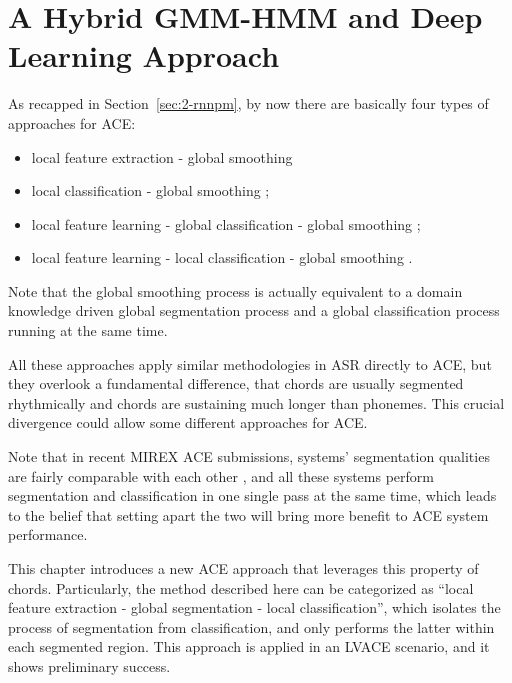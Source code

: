 
\chapter{A Hybrid GMM-HMM and Deep Learning Approach}\label{cp:ghmm} %


As recapped in Section~\ref{sec:2-rnnpm}, by now there are basically four types of approaches for ACE:
\begin{itemize}
\item local feature extraction - global smoothing \cite{fujishima1999realtime,sheh2003chord}
\item local classification - global smoothing \cite{humphrey2012rethinking};
\item local feature learning - global classification - global smoothing \cite{boulanger2013audio,sigtia2015audio};
\item local feature learning - local classification - global smoothing \cite{zhou2015chord}.
\end{itemize}
Note that the global smoothing process is actually equivalent to a domain knowledge driven global segmentation process and a global classification process running at the same time.

All these approaches apply similar methodologies in ASR \cite{deng2014deep,bourlard2012connectionist} directly to ACE, but they overlook a fundamental difference, that chords are usually segmented rhythmically and chords are sustaining much longer than phonemes. This crucial divergence could allow some different approaches for ACE.

Note that in recent MIREX ACE submissions, systems' segmentation qualities are fairly comparable with each other \cite{burgoyne2014comparative}, and all these systems perform segmentation and classification in one single pass at the same time, which leads to the belief that setting apart the two will bring more benefit to ACE system performance.

This chapter introduces a new ACE approach that leverages this property of chords. Particularly, the method described here can be categorized as ``local feature extraction - global segmentation - local classification'', which isolates the process of segmentation from classification, and only performs the latter within each segmented region. This approach is applied in an LVACE scenario, and it shows preliminary success.

